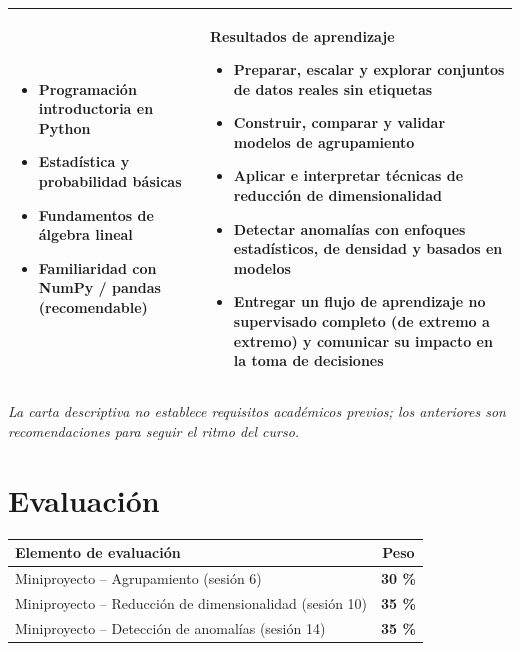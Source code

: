 \documentclass[11pt,letterpaper]{article}
\newcommand{\hd}[1]{\leavevmode\color{white}\textbf{#1}}
\begin{document}
\begin{center}
\renewcommand{\arraystretch}{1.25}
\begin{tabular}{|>{\columncolor{reqfondo}}p{}|>{\columncolor{resfondo}}p{}|}
\hline
{\color{marino}\textbf{Requisitos previos}}
\begin{itemize}[leftmargin=1.4em,topsep=2pt,itemsep=0pt]
  \item Programación introductoria en Python
  \item Estadística y probabilidad básicas
  \item Fundamentos de álgebra lineal
  \item Familiaridad con NumPy / pandas (recomendable)
\end{itemize}
&
{\color{marino}\textbf{Resultados de aprendizaje}}
\begin{itemize}[leftmargin=1.4em,topsep=2pt,itemsep=0pt]
  \item Preparar, escalar y explorar conjuntos de datos reales sin etiquetas
  \item Construir, comparar y validar modelos de agrupamiento
  \item Aplicar e interpretar técnicas de reducción de dimensionalidad
  \item Detectar anomalías con enfoques estadísticos, de densidad y basados en modelos
  \item Entregar un flujo de aprendizaje no supervisado completo (de extremo a
        extremo) y comunicar su impacto en la toma de decisiones
\end{itemize}
\\ \hline
\end{tabular}
\end{center}

{\footnotesize\itshape La carta descriptiva no establece requisitos académicos
previos; los anteriores son recomendaciones para seguir el ritmo del curso.}

\section{Evaluación}

\begin{center}
\renewcommand{\arraystretch}{1.5}
\begin{tabularx}{\textwidth}{|X|c|}
\hline
\rowcolor{marino}
{\hd{Elemento de evaluación}} & {\hd{Peso}} \\ \hline
Miniproyecto -- Agrupamiento (sesión 6)                               & \textbf{30 \%} \\ \hline
Miniproyecto -- Reducción de dimensionalidad (sesión 10)                & \textbf{35 \%} \\ \hline
Miniproyecto -- Detección de anomalías (sesión 14)                     & \textbf{35 \%} \\ \hline
\end{tabularx}
\end{center}
\end{document}
